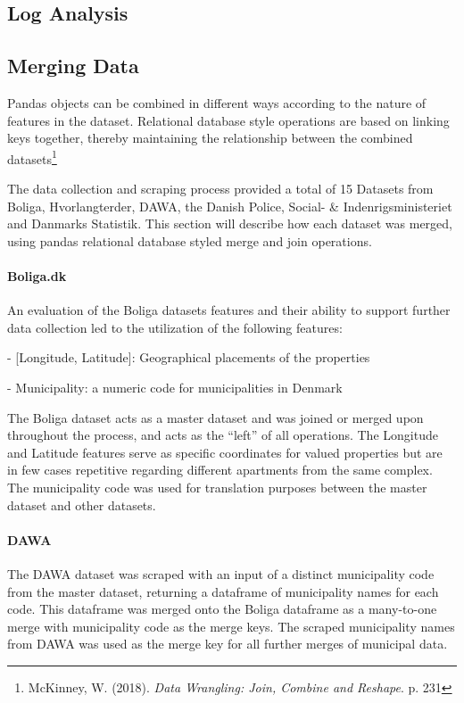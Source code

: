 \documentclass[12pt,a4paper]{article}
\begin{document}
\subsection{Log Analysis}


\subsection{Merging Data}
Pandas objects can be combined in different ways according to the nature of features in the dataset. Relational database style operations are based on linking keys together, thereby maintaining the relationship between the combined datasets\footnote{McKinney, W. (2018). \textit{Data Wrangling: Join, Combine and Reshape}. p. 231 }

The data collection and scraping process provided a total of 15 Datasets from Boliga, Hvorlangterder, DAWA, the Danish Police, Social- \& Indenrigsministeriet and Danmarks Statistik. This section will describe how each dataset was merged, using pandas relational database styled merge and join operations. 

\paragraph{Boliga.dk\newline}
An evaluation of the Boliga datasets features and their ability to support further data collection led to the utilization of the following features: 

-	[Longitude, Latitude]: Geographical placements of the properties

-	Municipality: a numeric code for municipalities in Denmark

The Boliga dataset acts as a master dataset and was joined or merged upon throughout the process, and acts as the “left” of all operations. The Longitude and Latitude features serve as specific coordinates for valued properties but are in few cases repetitive regarding different apartments from the same complex. The municipality code was used for translation purposes between the master dataset and other datasets.  

\paragraph{DAWA\newline}
The DAWA dataset was scraped with an input of a distinct municipality code from the master dataset, returning a dataframe of municipality names for each code. This dataframe was merged onto the Boliga dataframe as a many-to-one merge with municipality code as the merge keys. The scraped municipality names from DAWA was used as the merge key for all further merges of municipal data. 
\end{document}
